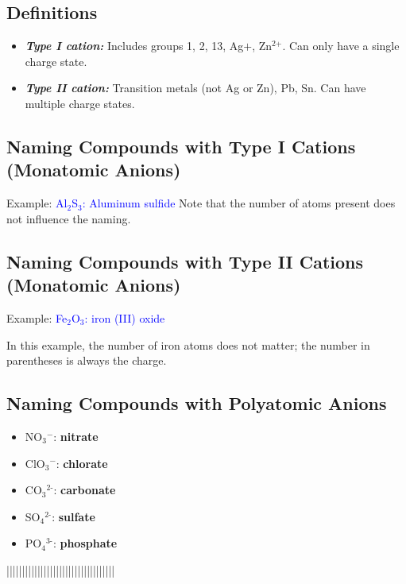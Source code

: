 \documentclass[a4paper, 12pt]{article}
\begin{document}
\subsection*{Definitions}
\begin{itemize}[leftmargin=*,nosep]
    \item \textbf{\emph{Type I cation:}} Includes groups 1, 2, 13, Ag$+$, Zn$^{\text{2+}}$. Can only have a single charge state.
    \item \textbf{\emph{Type II cation:}} Transition metals (not Ag or Zn), Pb, Sn. Can have multiple charge states.
\end{itemize}

\subsection*{Naming Compounds with Type I Cations (Monatomic Anions)}
 
Example: \textcolor{blue}{Al$_2$S$_3$: Aluminum sulfide}  
Note that the number of atoms present does not influence the naming.

\subsection*{Naming Compounds with Type II Cations (Monatomic Anions)}
 
Example: \textcolor{blue}{Fe$_2$O$_3$: iron (III) oxide}
 
In this example, the number of iron atoms does not matter; the number in parentheses is always the charge.

\subsection*{Naming Compounds with Polyatomic Anions}
\begin{itemize}[leftmargin=*,nosep]
    \item NO$_3$$^-$: \textbf{nitrate}
    \item ClO$_3$$^-$: \textbf{chlorate}
    \item CO$_3$$^{\text{2-}}$: \textbf{carbonate}
    \item SO$_4$$^{\text{2-}}$: \textbf{sulfate}
    \item PO$_4$$^{\text{3-}}$: \textbf{phosphate}
\end{itemize}
|||||||||||||||||||||||||||||||||||
\end{document}
